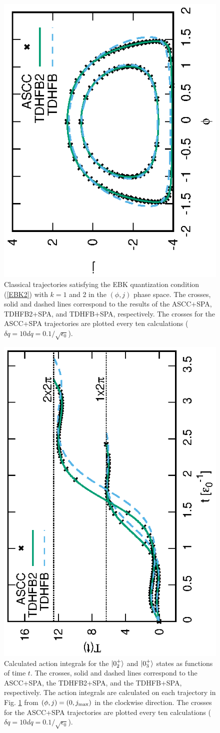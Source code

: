 \documentclass[11pt]{book} %
\begin{document}
\begin{figure}[thb]
 \begin{center}
   \includegraphics[height=0.45\textwidth,angle=-90]{images/N16X3p2trajectory.eps}
 \end{center}
\caption{Classical trajectories satisfying the EBK quantization condition
(\ref{EBK2}) with $k=1$ and 2 in the $(\phi,j)$ phase space.
The crosses, solid and dashed lines correspond to the results
of the ASCC+SPA, TDHFB2+SPA, and TDHFB+SPA, respectively.
The crosses for the ASCC+SPA trajectories are plotted every ten calculations
($\delta q = 10dq =0.1/\sqrt{\epsilon_0}$). 
}
\label{fig:N16_traj}
\end{figure}
\begin{figure}[thb]
 \begin{center}
   \includegraphics[height=0.5\textwidth,angle=-90]{images/N16X3p2action.eps}
 \end{center}
\caption{Calculated action integrals for the $\ket{0_2^+}$ and $\ket{0_3^+}$ states as functions of time $t$.
The crosses, solid and dashed lines correspond to the ASCC+SPA,
the TDHFB2+SPA, and the TDHFB+SPA, respectively. 
The action integrals are calculated on each trajectory in Fig. \ref{fig:N16_traj}
from $(\phi,j)=(0,j_{\rm max})$ in the clockwise direction.
The crosses for the ASCC+SPA trajectories are plotted every ten calculations
($\delta q = 10dq =0.1/\sqrt{\epsilon_0}$). 
}
\label{fig:N16_tau}
\end{figure}
\end{document}
